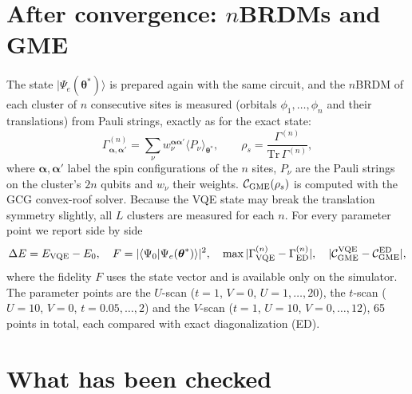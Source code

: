 \documentclass[11pt,a4paper]{article}
\begin{document}
\section{After convergence: $n$BRDMs and GME}\label{sec:gme}

The state $|\Psi_e(\boldsymbol\theta^*)\rangle$ is prepared again with the same
circuit, and the $n$BRDM of each cluster of $n$ consecutive sites is measured
(orbitals $\phi_1, \dots, \phi_n$ and their translations) from Pauli strings, exactly as for the exact state:
\begin{equation}
  \Gamma^{(n)}_{\boldsymbol\alpha,\boldsymbol\alpha'}
  = \sum_\nu w^{\boldsymbol\alpha\boldsymbol\alpha'}_\nu \langle P_\nu \rangle_{\boldsymbol\theta^*} ,
  \qquad \rho_s = \frac{\Gamma^{(n)}}{\mathrm{Tr}\,\Gamma^{(n)}} ,
\end{equation}
where $\boldsymbol\alpha, \boldsymbol\alpha'$ label the spin configurations of
the $n$ sites, $P_\nu$ are the Pauli strings on the cluster's $2n$ qubits and
$w_\nu$ their weights. $\mathcal{C}_{\rm GME}(\rho_s)$ is computed with the GCG
convex-roof solver. Because the VQE state may break the translation symmetry
slightly, all $L$ clusters are measured for each $n$. For every parameter point
we report side by side
\begin{equation}
  \Delta E = E_{\rm VQE} - E_0 , \quad
  F = |\langle \Psi_0 | \Psi_e(\boldsymbol\theta^*) \rangle|^2 , \quad
  \max |\Gamma^{(n)}_{\rm VQE} - \Gamma^{(n)}_{\rm ED}| , \quad
  |\mathcal{C}_{\rm GME}^{\rm VQE} - \mathcal{C}_{\rm GME}^{\rm ED}| ,
\end{equation}
where the fidelity $F$ uses the state vector and is available only on the
simulator. The parameter points are the $U$-scan
($t = 1$, $V = 0$, $U = 1, \dots, 20$), the $t$-scan ($U = 10$, $V = 0$,
$t = 0.05, \dots, 2$) and the $V$-scan ($t = 1$, $U = 10$, $V = 0, \dots, 12$),
65 points in total, each compared with exact diagonalization (ED).

\section{What has been checked}\label{sec:checks}
\end{document}
